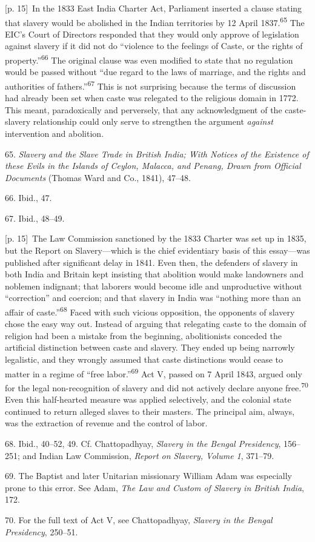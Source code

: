 \documentclass[10pt,a4paper]{article}
\begin{document}
{\scriptsize\color{gray} [p. 15]}\ In the 1833 East India Charter Act, Parliament inserted a clause stating that slavery would be abolished in the Indian territories by 12 April 1837.\nobreak\textsuperscript{65} The EIC’s Court of Directors responded that they would only approve of legislation against slavery if it did not do “violence to the feelings of Caste, or the rights of property.”\nobreak\textsuperscript{66} The original clause was even modified to state that no regulation would be passed without “due regard to the laws of marriage, and the rights and authorities of fathers.”\nobreak\textsuperscript{67} This is not surprising because the terms of discussion had already been set when caste was relegated to the religious domain in 1772. This meant, paradoxically and perversely, that any acknowledgment of the caste-slavery relationship could only serve to strengthen the argument \textit{against} intervention and abolition.\par{\small 65. \textit{Slavery and the Slave Trade in British India; With Notices of the Existence of these Evils in the Islands of Ceylon, Malacca, and Penang, Drawn from Official Documents} (Thomas Ward and Co., 1841), 47–48.\par}{\small 66. Ibid., 47.\par}{\small 67. Ibid., 48–49.\par}
{\scriptsize\color{gray} [p. 15]}\ The Law Commission sanctioned by the 1833 Charter was set up in 1835, but the Report on Slavery—which is the chief evidentiary basis of this essay—was published after significant delay in 1841. Even then, the defenders of slavery in both India and Britain kept insisting that abolition would make landowners and noblemen indignant; that laborers would become idle and unproductive without “correction” and coercion; and that slavery in India was “nothing more than an affair of caste.”\nobreak\textsuperscript{68} Faced with such vicious opposition, the opponents of slavery chose the easy way out. Instead of arguing that relegating caste to the domain of religion had been a mistake from the beginning, abolitionists conceded the artificial distinction between caste and slavery. They ended up being narrowly legalistic, and they wrongly assumed that caste distinctions would cease to matter in a regime of “free labor.”\nobreak\textsuperscript{69} Act V, passed on 7 April 1843, argued only for the legal non-recognition of slavery and did not actively declare anyone free.\nobreak\textsuperscript{70} Even this half-hearted measure was applied selectively, and the colonial state continued to return alleged slaves to their masters. The principal aim, always, was the extraction of revenue and the control of labor.\par{\small 68. Ibid., 40–52, 49. Cf. Chattopadhyay, \textit{Slavery in the Bengal Presidency}, 156–251; and Indian Law Commission, \textit{Report on Slavery, Volume 1}, 371–79.\par}{\small 69. The Baptist and later Unitarian missionary William Adam was especially prone to this error. See Adam, \textit{The Law and Custom of Slavery in British India}, 172.\par}{\small 70. For the full text of Act V, see Chattopadhyay, \textit{Slavery in the Bengal Presidency}, 250–51.\par}
\end{document}
